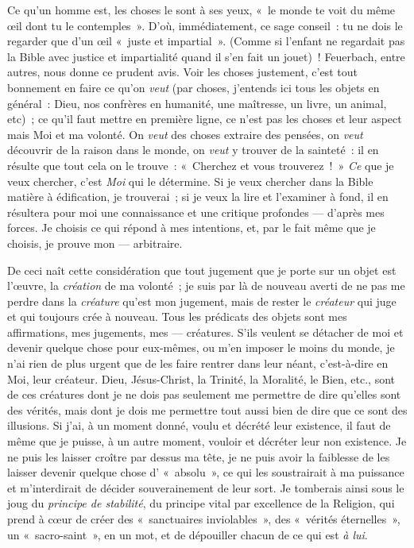 \documentclass[french,twoside]{book} %
\begin{document}
Ce qu’un homme est, les choses le sont à ses yeux, « le monde te voit du même œil dont tu le contemples ». D’où, immédiatement, ce sage conseil : tu ne dois le regarder que d’un œil « juste et impartial ». (Comme si l’enfant ne regardait pas la Bible avec justice et impartialité quand il s’en fait un jouet) ! Feuerbach, entre autres, nous donne ce prudent avis. Voir les choses justement, c’est tout bonnement en faire ce qu’on \emph{veut} (par choses, j’entends ici tous les objets en général : Dieu, nos confrères en humanité, une maîtresse, un livre, un animal, etc) ; ce qu’il faut mettre en première ligne, ce n’est pas les choses et leur aspect mais Moi et ma volonté. On \emph{veut} des choses extraire des pensées, on \emph{veut} découvrir de la raison dans le monde, on \emph{veut} y trouver de la sainteté : il en résulte que tout cela on le trouve : « Cherchez et vous trouverez ! » \emph{Ce} que je veux chercher, c’est \emph{Moi} qui le détermine. Si je veux chercher dans la Bible matière à édification, je trouverai ; si je veux la lire et l’examiner à fond, il en résultera pour moi une connaissance et une critique profondes — d’après mes forces. Je choisis ce qui répond à mes intentions, et, par le fait même que je choisis, je prouve mon — arbitraire.\par
De ceci naît cette considération que tout jugement que je porte sur un objet est l’œuvre, la \emph{création} de ma volonté ; je suis par là de nouveau averti de ne pas me perdre dans la \emph{créature} qu’est mon jugement, mais de rester le \emph{créateur} qui juge et qui toujours crée à nouveau. Tous les prédicats des objets sont mes affirmations, mes jugements, mes — créatures. S’ils veulent se détacher de moi et devenir quelque chose  pour eux-mêmes, ou m’en imposer le moins du monde, je n’ai rien de plus urgent que de les faire rentrer dans leur néant, c’est-à-dire en Moi, leur créateur. Dieu, Jésus-Christ, la Trinité, la Moralité, le Bien, etc., sont de ces créatures dont je ne dois pas seulement me permettre de dire qu’elles sont des vérités, mais dont je dois me permettre tout aussi bien de dire que ce sont des illusions. Si j’ai, à un moment donné, voulu et décrété leur existence, il faut de même que je puisse, à un autre moment, vouloir et décréter leur non existence. Je ne puis les laisser croître par dessus ma tête, je ne puis avoir la faiblesse de les laisser devenir quelque chose d’ « absolu », ce qui les soustrairait à ma puissance et m’interdirait de décider souverainement de leur sort. Je tomberais ainsi sous le joug du \emph{principe de stabilité}, du principe vital par excellence de la Religion, qui prend à cœur de créer des « sanctuaires inviolables », des « vérités éternelles », un « sacro-saint », en un mot, et de dépouiller chacun de ce qui est \emph{à lui}.\par
\end{document}
